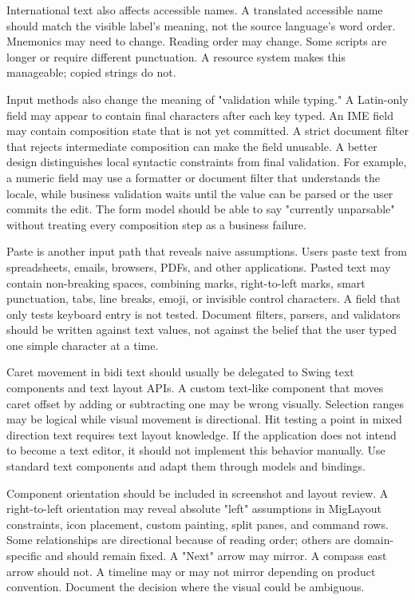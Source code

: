 International text also affects accessible names. A translated accessible name should match the visible label's meaning, not the source language's word order. Mnemonics may need to change. Reading order may change. Some scripts are longer or require different punctuation. A resource system makes this manageable; copied strings do not.

Input methods also change the meaning of "validation while typing." A Latin-only
field may appear to contain final characters after each key typed. An IME field
may contain composition state that is not yet committed. A strict document
filter that rejects intermediate composition can make the field unusable. A
better design distinguishes local syntactic constraints from final validation.
For example, a numeric field may use a formatter or document filter that
understands the locale, while business validation waits until the value can be
parsed or the user commits the edit. The form model should be able to say
"currently unparsable" without treating every composition step as a business
failure.

Paste is another input path that reveals naive assumptions. Users paste text
from spreadsheets, emails, browsers, PDFs, and other applications. Pasted text
may contain non-breaking spaces, combining marks, right-to-left marks, smart
punctuation, tabs, line breaks, emoji, or invisible control characters. A field
that only tests keyboard entry is not tested. Document filters, parsers, and
validators should be written against text values, not against the belief that
the user typed one simple character at a time.

Caret movement in bidi text should usually be delegated to Swing text
components and text layout APIs. A custom text-like component that moves caret
offset by adding or subtracting one may be wrong visually. Selection ranges may
be logical while visual movement is directional. Hit testing a point in mixed
direction text requires text layout knowledge. If the application does not
intend to become a text editor, it should not implement this behavior manually.
Use standard text components and adapt them through models and bindings.

Component orientation should be included in screenshot and layout review. A
right-to-left orientation may reveal absolute "left" assumptions in MigLayout
constraints, icon placement, custom painting, split panes, and command rows.
Some relationships are directional because of reading order; others are
domain-specific and should remain fixed. A "Next" arrow may mirror. A compass
east arrow should not. A timeline may or may not mirror depending on product
convention. Document the decision where the visual could be ambiguous.

